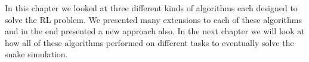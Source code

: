 In this chapter we looked at three different kinds of algorithms each designed to solve the RL problem.
We presented many extensions to each of these algorithms and in the end presented a new approach also.
In the next chapter we will look at how all of these algorithms performed on different tasks to eventually solve the snake simulation.
